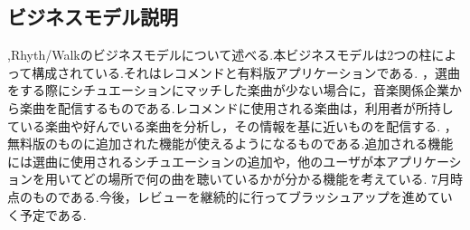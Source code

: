 \subsection{ビジネスモデル説明}
,Rhyth/Walkのビジネスモデルについて述べる.本ビジネスモデルは2つの柱によって構成されている.それはレコメンドと有料版アプリケーションである.
，選曲をする際にシチュエーションにマッチした楽曲が少ない場合に，音楽関係企業から楽曲を配信するものである.レコメンドに使用される楽曲は，利用者が所持している楽曲や好んでいる楽曲を分析し，その情報を基に近いものを配信する.
，無料版のものに追加された機能が使えるようになるものである.追加される機能には選曲に使用されるシチュエーションの追加や，他のユーザが本アプリケーションを用いてどの場所で何の曲を聴いているかが分かる機能を考えている.
7月時点のものである.今後，レビューを継続的に行ってブラッシュアップを進めていく予定である.

